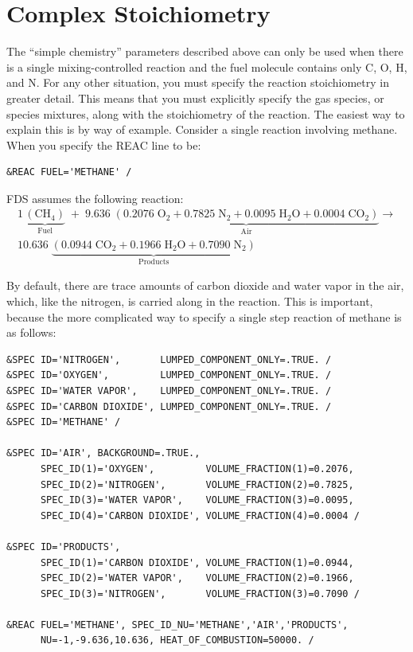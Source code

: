 \documentclass[11pt]{book}
\begin{document}
\clearpage

\section{Complex Stoichiometry}
\label{info:REAC_Diagnostics}

The ``simple chemistry'' parameters described above can only be used when there is a single mixing-controlled reaction and the fuel molecule contains only C, O, H, and N.
For any other situation, you must specify the reaction stoichiometry in greater detail. This means that you must explicitly specify the gas species, or species mixtures, along with
the stoichiometry of the reaction. The easiest way to explain this is by way of example. Consider a single reaction involving methane. When you specify the {\ct REAC} line to be:

\begin{lstlisting}
&REAC FUEL='METHANE' /
\end{lstlisting}

\noindent FDS assumes the following reaction:
\begin{multline}
1\,\underbrace{\mathrm{ (CH_4) }}_\text{Fuel} \; + \;
9.636 \; \underbrace{ \mathrm{\left( 0.2076 \; O_2 + 0.7825 \; N_2 + 0.0095 \; H_2O + 0.0004 \; CO_2 \right)}}_\text{Air} \longrightarrow \\
10.636 \; \underbrace{\mathrm{(0.0944 \; CO_2 +  0.1966 \; H_2O + 0.7090 \; N_2)}}_\text{Products}
\end{multline}

\noindent By default, there are trace amounts of carbon dioxide and water vapor in the air, which, like the nitrogen, is carried along in the reaction. This is important, because the more complicated way to specify a single step reaction of methane is as follows:

\begin{lstlisting}
&SPEC ID='NITROGEN',       LUMPED_COMPONENT_ONLY=.TRUE. /
&SPEC ID='OXYGEN',         LUMPED_COMPONENT_ONLY=.TRUE. /
&SPEC ID='WATER VAPOR',    LUMPED_COMPONENT_ONLY=.TRUE. /
&SPEC ID='CARBON DIOXIDE', LUMPED_COMPONENT_ONLY=.TRUE. /
&SPEC ID='METHANE' /

&SPEC ID='AIR', BACKGROUND=.TRUE.,
      SPEC_ID(1)='OXYGEN',         VOLUME_FRACTION(1)=0.2076,
      SPEC_ID(2)='NITROGEN',       VOLUME_FRACTION(2)=0.7825,
      SPEC_ID(3)='WATER VAPOR',    VOLUME_FRACTION(3)=0.0095,
      SPEC_ID(4)='CARBON DIOXIDE', VOLUME_FRACTION(4)=0.0004 /

&SPEC ID='PRODUCTS',
      SPEC_ID(1)='CARBON DIOXIDE', VOLUME_FRACTION(1)=0.0944,
      SPEC_ID(2)='WATER VAPOR',    VOLUME_FRACTION(2)=0.1966,
      SPEC_ID(3)='NITROGEN',       VOLUME_FRACTION(3)=0.7090 /

&REAC FUEL='METHANE', SPEC_ID_NU='METHANE','AIR','PRODUCTS',
      NU=-1,-9.636,10.636, HEAT_OF_COMBUSTION=50000. /
\end{lstlisting}
\end{document}
